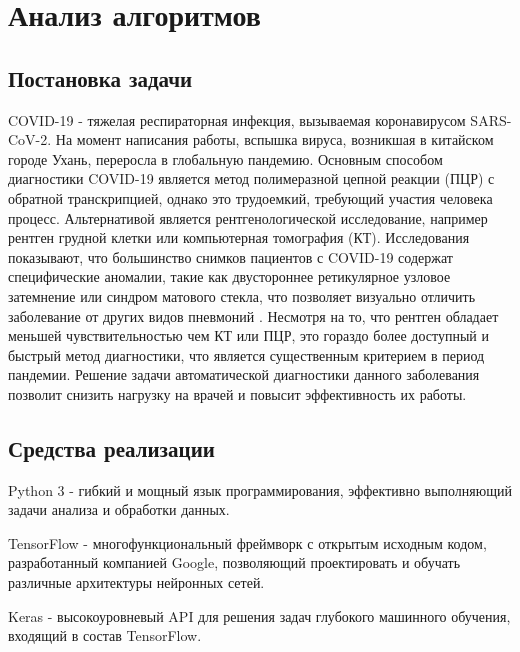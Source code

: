 \section{Анализ алгоритмов} \label{Dev}

\subsection{Постановка задачи}
COVID-19 - тяжелая респираторная инфекция, вызываемая коронавирусом SARS-CoV-2. На момент написания работы, вспышка вируса, возникшая в китайском городе Ухань, переросла в глобальную пандемию. Основным способом диагностики COVID-19 является метод полимеразной цепной реакции (ПЦР) с обратной транскрипцией, однако это трудоемкий, требующий участия человека процесс. Альтернативой является рентгенологической исследование, например рентген грудной клетки или компьютерная томография (КТ). Исследования показывают, что большинство снимков пациентов с COVID-19 содержат специфические аномалии, такие как двустороннее ретикулярное узловое затемнение или синдром матового стекла, что позволяет визуально отличить заболевание от других видов пневмоний \cite{wang2020covidnet}. Несмотря на то, что рентген обладает меньшей чувствительностью чем КТ или ПЦР, это гораздо более доступный и быстрый метод диагностики, что является существенным критерием в период пандемии. Решение задачи автоматической диагностики данного заболевания позволит снизить нагрузку на врачей и повысит эффективность их работы.


\subsection{Средства реализации}
Python 3 - гибкий и мощный язык программирования, эффективно выполняющий задачи анализа и обработки данных.

TensorFlow - многофункциональный фреймворк с открытым исходным кодом, разработанный компанией Google, позволяющий проектировать и обучать различные архитектуры нейронных сетей.

Keras - высокоуровневый API для решения задач глубокого машинного обучения, входящий в состав TensorFlow.


